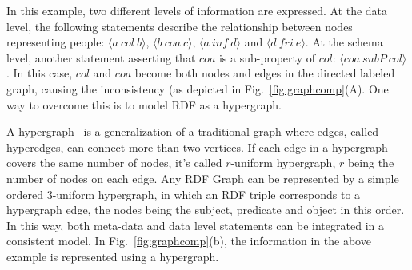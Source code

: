 In this example, two different levels of information are expressed. At the data level, the following statements describe the relationship between nodes representing people: $\langle a~ col~ b\rangle$, $\langle b~ coa~ c\rangle$, $\langle a~ inf~ d\rangle$ and $\langle d~ fri~ e\rangle$. At the schema level, another statement asserting that $coa$ is a sub-property of $col$: $\langle coa~ subP~ col\rangle$. In this case, $col$ and $coa$ become both nodes and edges in the directed labeled graph, causing the inconsistency (as depicted in Fig.~\ref{fig:graphcomp}(A). One way to overcome this is to model RDF as a hypergraph.

A hypergraph~\cite{Hypergraph} is a generalization of a traditional graph where edges, called hyperedges, can connect more than two vertices. If each edge in a hypergraph covers the same number of nodes, it's called $r$-uniform hypergraph, $r$ being the number of nodes on each edge. Any RDF Graph can be represented by a simple ordered 3-uniform hypergraph, in which an RDF triple corresponds to a hypergraph edge, the nodes being the subject, predicate and object in this order. In this way, both meta-data and data level statements can be integrated in a consistent model. In Fig.~\ref{fig:graphcomp}(b), the information in the above example is represented using a hypergraph.

